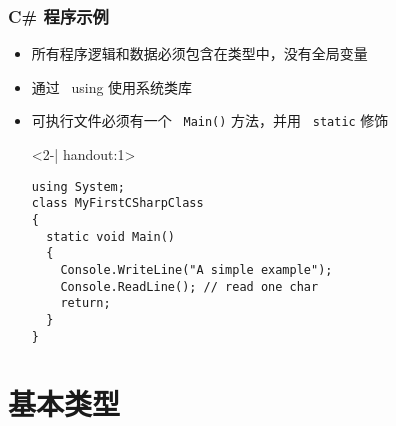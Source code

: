 \begin{frame}[fragile]
\frametitle{C\# 程序示例}
\begin{itemize}
\item<1-| handout:1> 所有程序逻辑和数据必须包含在类型中，没有全局变量

\item<1-| handout:1> 通过 ~using 使用系统类库

\item<1-| handout:1> 可执行文件必须有一个 ~\texttt{Main()} 方法，并用 ~\texttt{static} 修饰

  \begin{uncoverenv}<2-| handout:1>
\begin{lstlisting}
using System;
class MyFirstCSharpClass
{
  static void Main()
  {
    Console.WriteLine("A simple example");
    Console.ReadLine(); // read one char
    return;
  }
}
\end{lstlisting}
  \end{uncoverenv}

\end{itemize}
\end{frame}


\section{基本类型}


